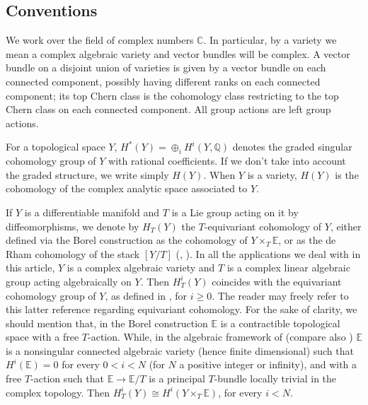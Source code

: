 \documentclass[a4paper,reqno]{amsart}
\theoremstyle{plain} %
\theoremstyle{definition} %
\theoremstyle{remark} %
\newcommand{\E}{\mathbb{E}}
\newcommand{\Q}{\mathbb{Q}}
\newcommand{\C}{\mathbb{C}}
\newcommand{\1}{\mathds{1}}   %
\begin{document}
\bigskip

\subsection{Conventions}\label{conventions}
We work over the field of complex numbers $\C$.
In particular, by a variety we mean a complex algebraic variety and vector bundles will be complex. 
A vector bundle on a disjoint union 
of varieties is given by a vector bundle on each connected component, possibly having different ranks on each 
connected component; its top Chern class is the cohomology class restricting to the top Chern class on each 
connected component. 
All group actions are left group actions.

For a topological space $Y$, 
$H^*(Y)=\oplus_i H^i(Y, \Q)$ denotes the graded singular cohomology group of $Y$ with rational coefficients. 
If we don't take into account the graded structure, we write simply $H(Y)$. When $Y$ is a variety, $H(Y)$
is the cohomology of the complex analytic space associated to $Y$. 

If $Y$ is a differentiable manifold and $T$ is a Lie group acting on it by diffeomorphisms, 
we denote by $H_T(Y)$ the $T$-equivariant cohomology of $Y$,
either defined via the Borel construction as the cohomology of $Y\times_T \E$, 
or as the de Rham cohomology of the stack $[Y/T]$ (\cite{Beh04}, \cite[Ch. 2]{BGNX}). 
In all the applications we deal with in this article, $Y$ is a complex algebraic variety and $T$ is a complex linear algebraic group
acting algebraically on $Y$. Then $H^i_T(Y)$ coincides with the equivariant cohomology group of $Y$, as defined in 
\cite{AF}, for $i\geq 0$. The reader may freely refer to this latter reference regarding equivariant cohomology.
For the sake of clarity, we should mention that, in the Borel construction $\E$ is a contractible topological space
with a free $T$-action. While, in the algebraic framework of \cite{AF} (compare also \cite{EG}) $\E$ is a nonsingular 
connected algebraic variety (hence finite dimensional) such that $H^i(\E)=0$ for every $0<i<N$ (for $N$ a positive integer or infinity),
and with a free $T$-action such that $\E \to \E/T$ is a principal $T$-bundle locally trivial in the complex topology.
Then $H_T^i(Y) \cong H^i(Y\times_T \E)$, for every $i<N$.



\bigskip
\end{document}
